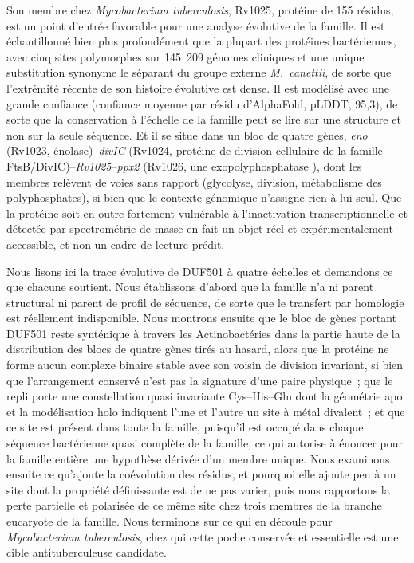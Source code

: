 \documentclass[11pt,a4paper]{article}
\newcommand{\mtb}{\textit{Mycobacterium tuberculosis}}
\begin{document}
Son membre chez \mtb{}, Rv1025, protéine de 155 résidus, est un point d'entrée favorable pour une analyse évolutive de la famille. Il est échantillonné bien plus profondément que la plupart des protéines bactériennes, avec cinq sites polymorphes sur 145~209 génomes cliniques et une unique substitution synonyme le séparant du groupe externe \textit{M.\ canettii}, de sorte que l'extrémité récente de son histoire évolutive est dense. Il est modélisé avec une grande confiance (confiance moyenne par résidu d'AlphaFold, pLDDT, 95,3), de sorte que la conservation à l'échelle de la famille peut se lire sur une structure et non sur la seule séquence. Et il se situe dans un bloc de quatre gènes, \textit{eno} (Rv1023, énolase)--\textit{divIC} (Rv1024, protéine de division cellulaire de la famille FtsB/DivIC)--\textit{Rv1025}--\textit{ppx2} (Rv1026, une exopolyphosphatase \citep{chuang2015rv1026ppx2,choi2012ppxgppa,tiwari2019polyp}), dont les membres relèvent de voies sans rapport (glycolyse, division, métabolisme des polyphosphates), si bien que le contexte génomique n'assigne rien à lui seul. Que la protéine soit en outre fortement vulnérable à l'inactivation transcriptionnelle \citep{bosch2021vulnerability} et détectée par spectrométrie de masse en fait un objet réel et expérimentalement accessible, et non un cadre de lecture prédit.

Nous lisons ici la trace évolutive de DUF501 à quatre échelles et demandons ce que chacune soutient. Nous établissons d'abord que la famille n'a ni parent structural ni parent de profil de séquence, de sorte que le transfert par homologie est réellement indisponible. Nous montrons ensuite que le bloc de gènes portant DUF501 reste synténique à travers les Actinobactéries dans la partie haute de la distribution des blocs de quatre gènes tirés au hasard, alors que la protéine ne forme aucun complexe binaire stable avec son voisin de division invariant, si bien que l'arrangement conservé n'est pas la signature d'une paire physique~; que le repli porte une constellation quasi invariante Cys--His--Glu dont la géométrie apo et la modélisation holo indiquent l'une et l'autre un site à métal divalent~; et que ce site est présent dans toute la famille, puisqu'il est occupé dans chaque séquence bactérienne quasi complète de la famille, ce qui autorise à énoncer pour la famille entière une hypothèse dérivée d'un membre unique. Nous examinons ensuite ce qu'ajoute la coévolution des résidus, et pourquoi elle ajoute peu à un site dont la propriété définissante est de ne pas varier, puis nous rapportons la perte partielle et polarisée de ce même site chez trois membres de la branche eucaryote de la famille. Nous terminons sur ce qui en découle pour \mtb{}, chez qui cette poche conservée et essentielle est une cible antituberculeuse candidate.
\end{document}
